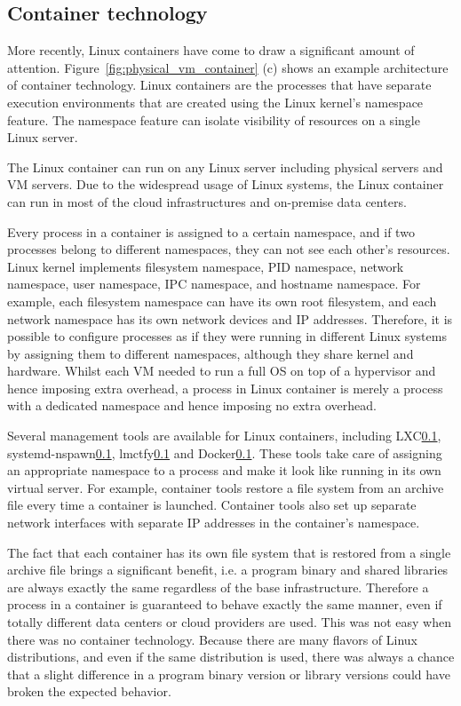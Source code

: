 \subsection{Container technology}

More recently, Linux containers\cite{menage2007adding} have come to draw a significant amount of attention.
Figure~\ref{fig:physical_vm_container} (c) shows an example architecture of container technology. 
Linux containers are the processes that have separate execution environments that are created using the Linux kernel's namespace feature.
The namespace feature can isolate visibility of resources on a single Linux server.

The Linux container can run on any Linux server including physical servers and VM servers.
Due to the widespread usage of Linux systems, the Linux container can run in most of the cloud infrastructures and on-premise data centers.

Every process in a container is assigned to a certain namespace, and if two processes belong to different namespaces, they can not see each other's resources. 
Linux kernel implements filesystem namespace, PID namespace, network namespace, user namespace, IPC namespace, and hostname namespace. 
For example, each filesystem namespace can have its own root filesystem, and each network namespace has its own network devices and IP addresses.
Therefore, it is possible to configure processes as if they were running in different Linux systems by assigning them to different namespaces, although they share kernel and hardware.
Whilst each VM needed to run a full OS on top of a hypervisor and hence imposing extra overhead, a process in Linux container is merely a process with a dedicated namespace and hence imposing no extra overhead.

Several management tools are available for Linux containers, including LXC\ref{}, systemd-nspawn\ref{}, lmctfy\ref{} and Docker\ref{}.
These tools take care of assigning an appropriate namespace to a process and make it look like running in its own virtual server.
For example, container tools restore a file system from an archive file every time a container is launched. 
Container tools also set up separate network interfaces with separate IP addresses in the container's namespace.

The fact that each container has its own file system that is restored from a single archive file brings a significant benefit, i.e. a program binary and shared libraries are always exactly the same regardless of the base infrastructure.
Therefore a process in a container is guaranteed to behave exactly the same manner, even if totally different data centers or cloud providers are used.
This was not easy when there was no container technology.
Because there are many flavors of Linux distributions, and even if the same distribution is used, there was always a chance that a slight difference in a program binary version or library versions could have broken the expected behavior.

